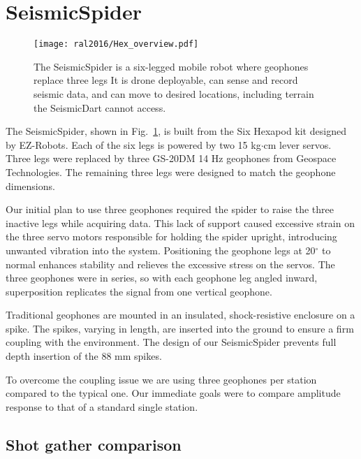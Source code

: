 \section[SeismicSpider]{SeismicSpider}

\begin{figure} \centering
	{\texttt{[image: ral2016/Hex\_overview.pdf]}}
	\caption{
		The SeismicSpider is a six-legged mobile robot where geophones replace three legs
		It is drone deployable, can sense and record seismic data, and can move to desired locations, including terrain the SeismicDart cannot access.}
	\label{fig:Hex_overview}
\end{figure}

The SeismicSpider, shown in Fig.~\ref{fig:Hex_overview}, is built from the Six Hexapod kit designed by EZ-Robots.
Each of the six legs is powered by two 15 kg$\cdot$cm lever servos.
Three legs were replaced by three GS-20DM 14 Hz geophones from Geospace Technologies.
The remaining three legs were designed to match the geophone dimensions.

Our initial plan to use three geophones required the spider to raise the three inactive legs while acquiring data.
This lack of support caused excessive strain on the three servo motors responsible for holding the spider upright, introducing unwanted vibration into the system.
Positioning the geophone legs at 20$^\circ$ to normal enhances stability and relieves the excessive stress on the servos.
The three geophones were in series, so with each geophone leg angled inward, superposition replicates the signal from one vertical geophone.

Traditional geophones are mounted in an insulated, shock-resistive enclosure on a spike.
The spikes, varying in length, are inserted into the ground to ensure a firm coupling with the environment.
The design of our SeismicSpider prevents full depth insertion of the 88 mm spikes.

To overcome the coupling issue we are using three geophones per station compared to the typical one.
Our immediate goals were to compare amplitude response to that of a standard single station.	
 
\subsection{Shot gather comparison}

